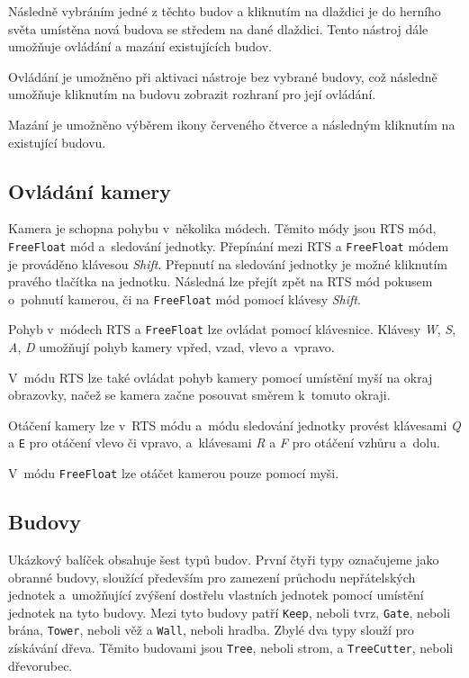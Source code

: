 \medskip
{}

\bigskip

Následně vybráním jedné z těchto budov a kliknutím na dlaždici je do herního světa umístěna nová budova se středem na dané dlaždici. Tento nástroj dále umožňuje ovládání a mazání existujících budov. 

Ovládání je umožněno při aktivaci nástroje bez vybrané budovy, což následně umožňuje kliknutím na budovu zobrazit rozhraní pro její ovládání.

Mazání je umožněno výběrem ikony červeného čtverce a následným kliknutím na existující budovu.

\subsection{Ovládání kamery}
Kamera je schopna pohybu v~několika módech. Těmito módy jsou RTS mód, \texttt{FreeFloat} mód a~sledování jednotky. Přepínání mezi RTS a \texttt{FreeFloat} módem je prováděno klávesou \textit{Shift}. Přepnutí na sledování jednotky je možné kliknutím pravého tlačítka na jednotku. Následná lze přejít zpět na RTS mód pokusem o~pohnutí kamerou, či na \texttt{FreeFloat} mód pomocí klávesy \textit{Shift}.

Pohyb v~módech RTS a \texttt{FreeFloat} lze ovládat pomocí klávesnice. Klávesy \textit{W}, \textit{S}, \textit{A}, \textit{D} umožňují pohyb kamery vpřed, vzad, vlevo a~vpravo. 

V~módu RTS lze také ovládat pohyb kamery pomocí umístění myší na okraj obrazovky, načež se kamera začne posouvat směrem k~tomuto okraji. 

Otáčení kamery lze v~RTS módu a~módu sledování jednotky provést klávesami \textit{Q} a \texttt{E} pro otáčení vlevo či vpravo, a~klávesami \textit{R} a \textit{F} pro otáčení vzhůru a~dolu. 

V~módu \texttt{FreeFloat} lze otáčet kamerou pouze pomocí myši.   

\subsection{Budovy}
\label{sec:buildings}
Ukázkový balíček obsahuje šest typů budov. První čtyři typy označujeme jako obranné budovy, sloužící především pro zamezení průchodu nepřátelských jednotek a~umožňující zvýšení dostřelu vlastních jednotek pomocí umístění jednotek na tyto budovy. Mezi tyto budovy patří \texttt{Keep}, neboli tvrz, \texttt{Gate}, neboli brána, \texttt{Tower}, neboli věž a \texttt{Wall}, neboli hradba. Zbylé dva typy slouží pro získávání dřeva. Těmito budovami jsou \texttt{Tree}, neboli strom, a \texttt{TreeCutter}, neboli dřevorubec. 

